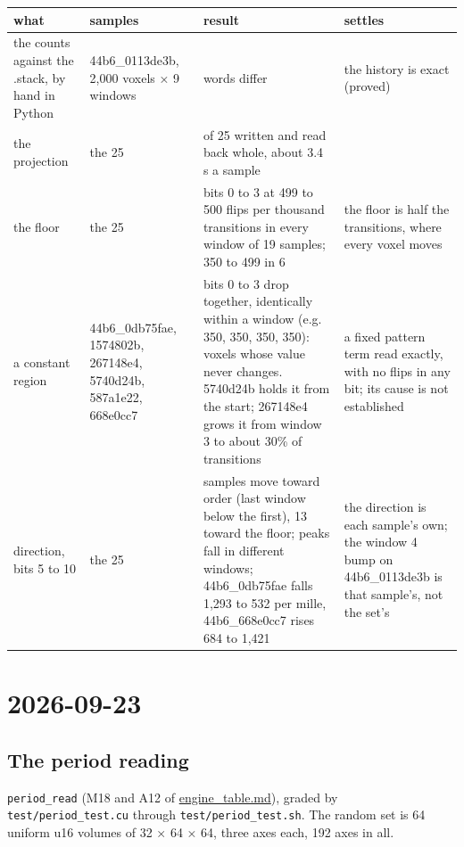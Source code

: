 {\footnotesize
\setlength{\tabcolsep}{6pt}
\begin{longtable}{>{\RaggedRight\arraybackslash}p{}>{\RaggedRight\arraybackslash}p{}>{\RaggedRight\arraybackslash}p{}>{\RaggedRight\arraybackslash}p{}}
\toprule
what & samples & result & settles \\
\midrule
\endhead
the counts against the .stack, by hand in Python & 44b6\_\allowbreak{}0113de3b, 2,000 voxels × 9 windows & 0 words differ & the history is exact (proved) \\
the projection & the 25 & 25 of 25 written and read back whole, about 3.4 s a sample &  \\
the floor & the 25 & bits 0 to 3 at 499 to 500 flips per thousand transitions in every window of 19 samples; 350 to 499 in 6 & the floor is half the transitions, where every voxel moves \\
a constant region & 44b6\_\allowbreak{}0db75fae, 1574802b, 267148e4, 5740d24b, 587a1e22, 668e0cc7 & bits 0 to 3 drop together, identically within a window (e.g. 350, 350, 350, 350): voxels whose value never changes. 5740d24b holds it from the start; 267148e4 grows it from window 3 to about 30\% of transitions & a fixed pattern term read exactly, with no flips in any bit; its cause is not established \\
direction, bits 5 to 10 & the 25 & 12 samples move toward order (last window below the first), 13 toward the floor; peaks fall in different windows; 44b6\_\allowbreak{}0db75fae falls 1,293 to 532 per mille, 44b6\_\allowbreak{}668e0cc7 rises 684 to 1,421 & the direction is each sample's own; the window 4 bump on 44b6\_\allowbreak{}0113de3b is that sample's, not the set's \\
\bottomrule
\end{longtable}
}

\section{\texorpdfstring{2026-09-23}{2026-09-23}}

\subsection{\texorpdfstring{The period reading}{The period reading}}

\texttt{period\_\allowbreak{}read} (M18 and A12 of \hyperref[chap:engine-table]{engine\_\allowbreak{}table.md}), graded by \texttt{test/\allowbreak{}period\_\allowbreak{}test.\allowbreak{}cu} through \texttt{test/\allowbreak{}period\_\allowbreak{}test.\allowbreak{}sh}. The random set is 64 uniform u16 volumes of 32 × 64 × 64, three axes each, 192 axes in all.

